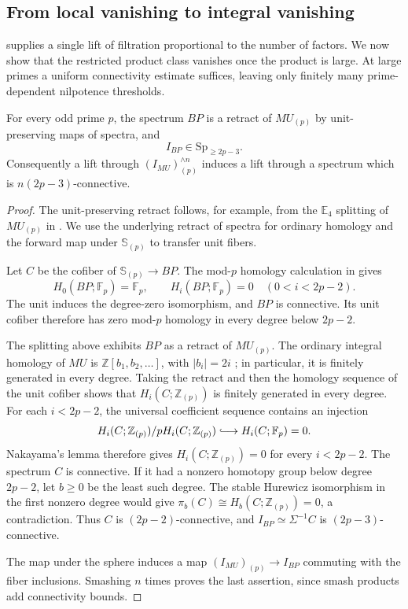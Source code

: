 \subsection{From local vanishing to integral vanishing}

 supplies a single lift of filtration
proportional to the number of factors.  We now show that the restricted
product class vanishes once the product is large.  At large primes a
uniform connectivity estimate suffices, leaving only finitely many
prime-dependent nilpotence thresholds.

\begin{lemma}
\label{lem:bp-unit-connectivity}
For every odd prime $p$, the spectrum $BP$ is a retract of $MU_{(p)}$
by unit-preserving maps of spectra, and
\[
I_{BP}\in\mathrm{Sp}_{\geq2p-3}.
\]
Consequently a lift through $(I_{MU})_{(p)}^{\wedge n}$ induces a
lift through a spectrum which is $n(2p-3)$-connective.
\end{lemma}

\begin{proof}
The unit-preserving retract follows, for example, from
the $\mathbb E_4$ splitting of $MU_{(p)}$ in
\cite[Theorem~1.1, the following paragraph, and Section~5]{BasterraMandell2013}.
We use the underlying retract of spectra for ordinary homology and
the forward map under $\mathbb S_{(p)}$ to transfer unit fibers.

Let $C$ be the cofiber of $\mathbb S_{(p)}\to BP$.  The mod-$p$
homology calculation in \cite[Section~5]{BasterraMandell2013} gives
\[
H_0(BP;\mathbb F_p)=\mathbb F_p,\qquad
H_i(BP;\mathbb F_p)=0\quad(0<i<2p-2).
\]
The unit induces the degree-zero isomorphism, and $BP$ is connective.
Its unit cofiber therefore has zero mod-$p$ homology in every degree
below $2p-2$.

The splitting above exhibits $BP$ as a retract of $MU_{(p)}$.
The ordinary integral homology of $MU$ is
$\mathbb Z[b_1,b_2,\ldots]$, with $|b_i|=2i$
\cite[Lecture~7, Proposition~2 and Corollary~3]{Lurie2010}; in particular, it is finitely
generated in every degree.  Taking the retract and then the homology
sequence of the unit cofiber shows that $H_i(C;\mathbb Z_{(p)})$ is
finitely generated in every degree.  For each $i<2p-2$, the universal
coefficient sequence contains an injection
\[
H_i(C;\mathbb Z_{(p)})/pH_i(C;\mathbb Z_{(p)})
 \lhook\joinrel\longrightarrow H_i(C;\mathbb F_p)=0.
\]
Nakayama's lemma therefore gives
$H_i(C;\mathbb Z_{(p)})=0$ for every $i<2p-2$.
The spectrum $C$ is connective.  If it had a nonzero homotopy group
below degree $2p-2$, let $b\geq0$ be the least such degree.
The stable Hurewicz isomorphism in the first nonzero degree would give
$\pi_b(C)\cong H_b(C;\mathbb Z_{(p)})=0$, a contradiction.
Thus $C$ is $(2p-2)$-connective, and
$I_{BP}\simeq\Sigma^{-1}C$ is $(2p-3)$-connective.

The map under the sphere induces a map
$(I_{MU})_{(p)}\to I_{BP}$ commuting with the fiber inclusions.
Smashing $n$ times proves the last assertion, since smash products
add connectivity bounds.
\end{proof}


